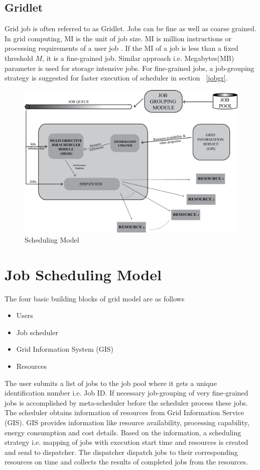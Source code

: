 \subsection{Gridlet}
Grid job is often referred to as Gridlet. Jobs can be fine as well as coarse grained. In grid computing, MI is the unit of job size. MI is million instructions or processing requirements of a user job \cite{liao2009research}. If the MI of a job is less than a fixed threshold $M$, it is a fine-grained job. Similar approach i.e. Megabytes(MB) parameter is used for storage intensive jobs. For fine-grained jobs, a job-grouping strategy is suggested for faster execution of scheduler in section ~\ref{jobgr}.
\begin{figure}[ht]
    \centering
    \includegraphics[width=1.0\columnwidth]{scheduler}
    \caption{Scheduling Model}
	\label{fig:Scheduling Model}
\end{figure}

\section{Job Scheduling Model}
The four basic building blocks of grid model are as follows 
\begin{itemize} 
 \item Users 
 \item Job scheduler 
 \item Grid Information System (GIS) 
 \item Resources
\end{itemize}
 The user submits a list of jobs to the job pool where it gets a unique identification number i.e. Job ID. If necessary job-grouping of very fine-grained jobs is accomplished by meta-scheduler before the scheduler process these jobs. The scheduler obtains information of resources from Grid Information Service (GIS). GIS provides information like resource availability, processing capability, energy consumption and cost details. Based on the information, a scheduling strategy i.e. mapping of jobs with execution start time and resources is created and send to dispatcher. The dispatcher dispatch jobs to their corresponding resources on time and collects the results of completed jobs from the resources.

